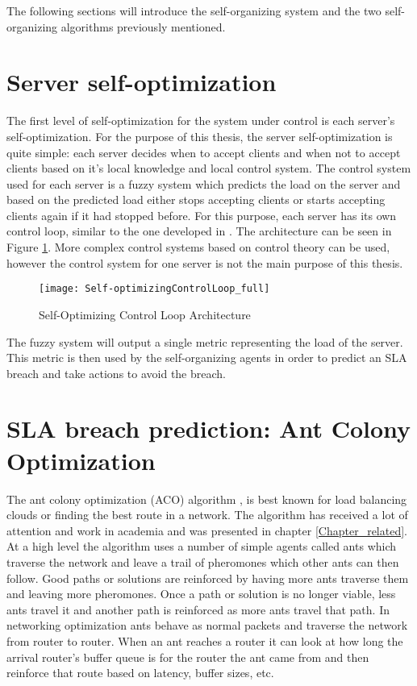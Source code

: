 The following sections will introduce the self-organizing system and the two self-organizing algorithms previously mentioned.

\section{Server self-optimization}

The first level of self-optimization for the system under control is each server's self-optimization. For the purpose of this thesis, the server self-optimization is quite simple: each server decides when to accept clients and when not to accept clients based on it's local knowledge and local control system. The control system used for each server is a fuzzy system which predicts the load on the server and based on the predicted load either stops accepting clients or starts accepting clients again if it had stopped before. For this purpose, each server has its own control loop, similar to the one developed in \cite{bogdan:seams07}. The architecture can be seen in Figure \ref{fig:selfopt-archi}. More complex control systems based on control theory can be used, however the control system for one server is not the main purpose of this thesis.

\begin{figure}
	\centering
	\texttt{[image: Self-optimizingControlLoop\_full]}
	\caption{Self-Optimizing Control Loop Architecture}
	\label{fig:selfopt-archi}
\end{figure}

The fuzzy system will output a single metric representing the load of the server. This metric is then used by the self-organizing agents in order to predict an SLA breach and take actions to avoid the breach.

\section{SLA breach prediction: Ant Colony Optimization}

The ant colony optimization (ACO) algorithm \cite{antalgorithm}, \cite{selforg:aco} is best known for load balancing clouds or finding the best route in a network. The algorithm has received a lot of attention and work in academia and was presented in chapter \ref{Chapter_related}. At a high level the algorithm uses a number of simple agents called ants which traverse the network and leave a trail of pheromones which other ants can then follow. Good paths or solutions are reinforced by having more ants traverse them and leaving more pheromones. Once a path or solution is no longer viable, less ants travel it and another path is reinforced as more ants travel that path. In networking optimization ants behave as normal packets and traverse the network from router to router. When an ant reaches a router it can look at how long the arrival router's buffer queue is for the router the ant came from and then reinforce that route based on latency, buffer sizes, etc.

